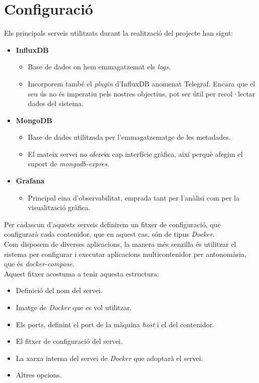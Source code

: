 \clearpage

\section*{Configuració}\label{sec:server-configuration}

Els principals serveis utilitzats durant la realització del projecte han sigut:

\begin{itemize}
    \item \textbf{InfluxDB}
    \begin{itemize}
        \item Base de dades on hem emmagatzemat els \textit{\gls{log}s}.
        \item {
            Incorporem també el \textit{\gls{plugin}} d’InfluxDB anomenat Telegraf.
            Encara que el seu ús no és imperatiu pels nostres objectius, pot ser útil per recol·lectar dades del sistema.
        }
    \end{itemize}
    \item \textbf{MongoDB}
    \begin{itemize}
        \item Base de dades utilitzada per l’emmagatzematge de les metadades.
        \item El mateix servei no ofereix cap interfície gràfica, així perquè afegim el suport de \textit{mongodb-expres}.
    \end{itemize}
    \item \textbf{Grafana}
    \begin{itemize}
        \item Principal eina d’observabilitat, emprada tant per l’anàlisi com per la visualització gràfica.
    \end{itemize}
\end{itemize}

\noindent
Per cadascun d’aquests serveis definirem un fitxer de configuració, que configurarà cada contenidor, que en aquest cas, són de tipus \textit{\gls{Docker}}. \\

\noindent
Com disposem de diverses aplicacions, la manera més senzilla és utilitzar el sistema per configurar i executar aplicacions multicontenidor per antonomàsia, que és \textit{\gls{docker-compose}}. \\

\noindent
Aquest fitxer acostuma a tenir aquesta estructura:

\begin{itemize}
    \item Definició del nom del servei.
    \item Imatge de \textit{\gls{Docker}} que es vol utilitzar.
    \item Els ports, definint el port de la màquina \textit{host} i el del contenidor.
    \item El fitxer de configuració del servei.
    \item La xarxa interna del servei de \textit{\gls{Docker}} que adoptarà el servei.
    \item Altres opcions.
\end{itemize}


